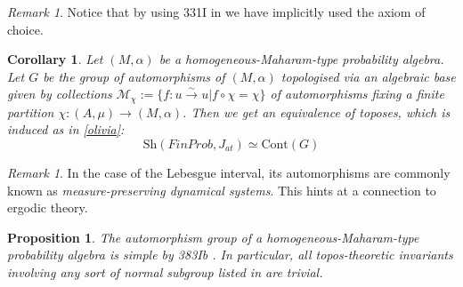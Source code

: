 \documentclass[a4paper]{amsproc}
\theoremstyle{plain}
\newtheorem{proposition}[theorem]{Proposition}
\newtheorem{corollary}[theorem]{Corollary}
\theoremstyle{definition}
\theoremstyle{remark}
\newtheorem{remark}[theorem]{Remark}
\numberwithin{equation}{section}
\begin{document}
\begin{remark}
Notice that by using 331I in \cite{fremlin} we have implicitly used the axiom of choice.
\end{remark}

\begin{corollary}\label{Galois} Let $(M, \alpha)$ be a homogeneous-Maharam-type probability algebra. Let $G$ be the group of automorphisms of $(M, \alpha)$ topologised via an algebraic base given by collections $\mathcal{M}_{\chi}:=\{f:u\overset{\sim}{\rightarrow} u| f\circ \chi=\chi\} $ of automorphisms fixing a finite partition $\chi: (A,\mu)\rightarrow (M, \alpha)$. Then we get an equivalence of toposes, which is induced as in \ref{olivia}:
\[\text{Sh}(FinProb, J_{at})\simeq \text{Cont}(G)\]
\end{corollary}
\begin{remark} In the case of the Lebesgue interval, its automorphisms are commonly known as \emph{measure-preserving dynamical systems}. This hints at a connection to ergodic theory.
\end{remark}
\begin{proposition} The automorphism group of a homogeneous-Maharam-type probability algebra is simple by 383Ib \cite{fremlin}. In particular, all topos-theoretic invariants involving any sort of normal subgroup listed in \cite{caramello_lafforgue} are trivial.
\end{proposition}
\end{document}
